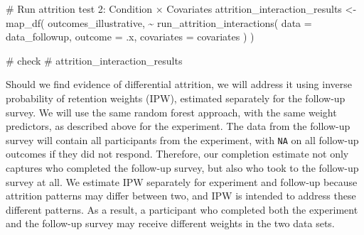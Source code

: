 \documentclass[
  letterpaper,
  DIV=11,
  numbers=noendperiod]{scrartcl}
\newenvironment{Shaded}{\begin{snugshade}}{\end{snugshade}}
\newcommand{\AttributeTok}[1]{\textcolor[rgb]{0.40,0.45,0.13}{#1}}
\newcommand{\CommentTok}[1]{\textcolor[rgb]{0.37,0.37,0.37}{#1}}
\newcommand{\FunctionTok}[1]{\textcolor[rgb]{0.28,0.35,0.67}{#1}}
\newcommand{\NormalTok}[1]{\textcolor[rgb]{0.00,0.23,0.31}{#1}}
\newcommand{\OtherTok}[1]{\textcolor[rgb]{0.00,0.23,0.31}{#1}}
\newcommand{\SpecialCharTok}[1]{\textcolor[rgb]{0.37,0.37,0.37}{#1}}
\begin{document}
\begin{Shaded}
\end{Shaded}

\begin{Shaded}
\begin{Highlighting}[]
\CommentTok{\# Run attrition test 2: Condition × Covariates}
\NormalTok{attrition\_interaction\_results }\OtherTok{\textless{}{-}} \FunctionTok{map\_df}\NormalTok{(}
\NormalTok{  outcomes\_illustrative,}
  \SpecialCharTok{\textasciitilde{}} \FunctionTok{run\_attrition\_interactions}\NormalTok{(}
      \AttributeTok{data =}\NormalTok{ data\_followup,}
      \AttributeTok{outcome =}\NormalTok{ .x,}
      \AttributeTok{covariates =}\NormalTok{ covariates}
\NormalTok{    )}
\NormalTok{)}

\CommentTok{\# check}
\CommentTok{\# attrition\_interaction\_results}
\end{Highlighting}
\end{Shaded}

Should we find evidence of differential attrition, we will address it
using inverse probability of retention weights (IPW), estimated
separately for the follow-up survey. We will use the same random forest
approach, with the same weight predictors, as described above for the
experiment. The data from the follow-up survey will contain all
participants from the experiment, with \texttt{NA} on all follow-up
outcomes if they did not respond. Therefore, our completion estimate not
only captures who completed the follow-up survey, but also who took to
the follow-up survey at all. We estimate IPW separately for experiment
and follow-up because attrition patterns may differ between two, and IPW
is intended to address these different patterns. As a result, a
participant who completed both the experiment and the follow-up survey
may receive different weights in the two data sets.
\end{document}
